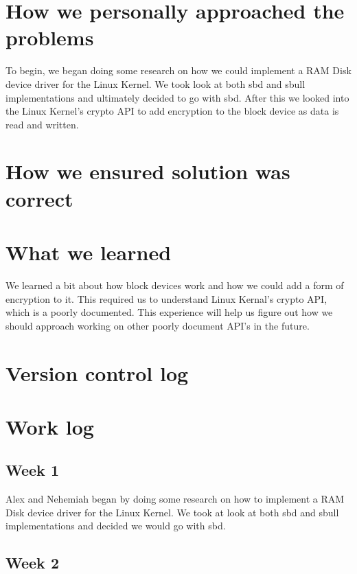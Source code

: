 \documentclass[letterpaper,10pt,titlepage]{article}
\begin{document}
\section{How we personally approached the problems}
To begin, we began doing some research on how we could implement a RAM Disk device driver for the Linux Kernel. We took look at both sbd and sbull implementations and ultimately decided to go with sbd. After this we looked into the Linux Kernel's crypto API to add encryption to the block device as data is read and written.

\section{How we ensured solution was correct}

\section{What we learned}
We learned a bit about how block devices work and how we could add a form of encryption to it. This required us to understand Linux Kernal's crypto API, which is a poorly documented. This experience will help us figure out how we should approach working on other poorly document API's in the future.

\section{Version control log}
\begin{versionhistory}
\end{versionhistory}

\section{Work log}
\subsection{Week 1}
Alex and Nehemiah began by doing some research on how to implement a RAM Disk device driver for the Linux Kernel. We took at look at both sbd and sbull implementations and decided we would go with sbd.
\subsection{Week 2}

%
%
\end{document}
